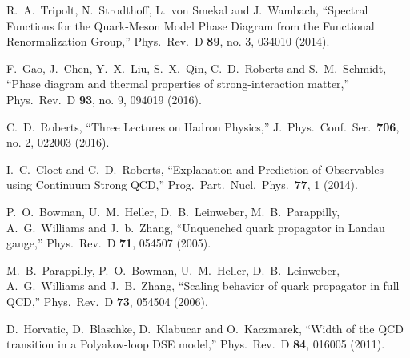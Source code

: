 \documentclass{webofc}
\begin{document}
\begin{thebibliography}{}
 
  R.~A.~Tripolt, N.~Strodthoff, L.~von Smekal and J.~Wambach,
  ``Spectral Functions for the Quark-Meson Model Phase Diagram from the Functional Renormalization Group,''
  Phys.\ Rev.\ D {\bf 89}, no. 3, 034010 (2014).

 
  F.~Gao, J.~Chen, Y.~X.~Liu, S.~X.~Qin, C.~D.~Roberts and S.~M.~Schmidt,
  ``Phase diagram and thermal properties of strong-interaction matter,''
  Phys.\ Rev.\ D {\bf 93}, no. 9, 094019 (2016).

  C.~D.~Roberts,
  ``Three Lectures on Hadron Physics,''
  J.\ Phys.\ Conf.\ Ser.\  {\bf 706}, no. 2, 022003 (2016).


  I.~C.~Cloet and C.~D.~Roberts,
  ``Explanation and Prediction of Observables using Continuum Strong QCD,''
  Prog.\ Part.\ Nucl.\ Phys.\  {\bf 77}, 1 (2014).

  P.~O.~Bowman, U.~M.~Heller, D.~B.~Leinweber, M.~B.~Parappilly, A.~G.~Williams and J.~b.~Zhang,
  ``Unquenched quark propagator in Landau gauge,''
  Phys.\ Rev.\ D {\bf 71}, 054507 (2005).

  M.~B.~Parappilly, P.~O.~Bowman, U.~M.~Heller, D.~B.~Leinweber,
A.~G.~Williams and J.~B.~Zhang,
  ``Scaling behavior of quark propagator in full QCD,''
  Phys.\ Rev.\ D {\bf 73}, 054504 (2006).


  D.~Horvatic, D.~Blaschke, D.~Klabucar and O.~Kaczmarek,
  ``Width of the QCD transition in a Polyakov-loop DSE model,''
  Phys.\ Rev.\ D {\bf 84}, 016005 (2011).


\end{thebibliography}
\end{document}
